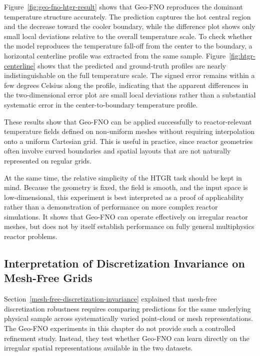 Figure~\ref{fig:geo-fno-htgr-result} shows that Geo-FNO reproduces the dominant temperature structure accurately. The prediction captures the hot central region and the decrease toward the cooler boundary, while the difference plot shows only small local deviations relative to the overall temperature scale. To check whether the model reproduces the temperature fall-off from the center to the boundary, a horizontal centerline profile was extracted from the same sample. Figure~\ref{fig:htgr-centerline} shows that the predicted and ground-truth profiles are nearly indistinguishable on the full temperature scale. The signed error remains within a few degrees Celsius along the profile, indicating that the apparent differences in the two-dimensional error plot are small local deviations rather than a substantial systematic error in the center-to-boundary temperature profile.

These results show that Geo-FNO can be applied successfully to reactor-relevant temperature fields defined on non-uniform meshes without requiring interpolation onto a uniform Cartesian grid. This is useful in practice, since reactor geometries often involve curved boundaries and spatial layouts that are not naturally represented on regular grids.

At the same time, the relative simplicity of the HTGR task should be kept in mind. Because the geometry is fixed, the field is smooth, and the input space is low-dimensional, this experiment is best interpreted as a proof of applicability rather than a demonstration of performance on more complex reactor simulations. It shows that Geo-FNO can operate effectively on irregular reactor meshes, but does not by itself establish performance on fully general multiphysics reactor problems.

\subsection{Interpretation of Discretization Invariance on Mesh-Free Grids}

Section~\ref{mesh-free-discretization-invariance} explained that mesh-free discretization robustness requires comparing predictions for the same underlying physical sample across systematically varied point-cloud or mesh representations. The Geo-FNO experiments in this chapter do not provide such a controlled refinement study. Instead, they test whether Geo-FNO can learn directly on the irregular spatial representations available in the two datasets.

